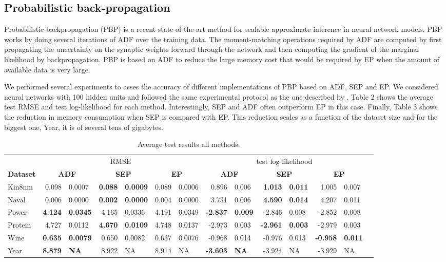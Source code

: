 \subsection{Probabilistic back-propagation}

Probabilistic-backpropagation (PBP) \cite{hernandez2015probabilistic} is a
recent state-of-the-art method for scalable approximate inference in neural
network models. PBP works by doing several iterations of ADF over the training
data.  The moment-matching operations required by ADF are computed by
first propagating the uncertainty on the synaptic weights forward through the network
and then computing the gradient of the marginal likelihood by backpropagation.
PBP is based on ADF to reduce the large memory cost that would be required by EP
when the amount of available data is very large.

We performed several experiments to asses the accuracy of different implementations of PBP
based on ADF, SEP and EP. We considered neural networks with 100 hidden units and followed the same experimental protocol 
as the one described by \cite{hernandez2015probabilistic}.
Table 2 shows the average test RMSE and test log-likelihood for each method.
Interestingly, SEP and ADF often outperform EP in this case.
Finally, Table 3 shows the reduction in memory consumption when SEP is compared with EP.
This reduction scales as a function of the dataset size and for the biggest
one, Year, it is of several tens of gigabytes.
 
\begin{table} 
\small
\centering \caption{ Average test results all methods. } \label{tab:results} \begin{tabular}{l@{\ica}r@{$\pm$}l@{\ica}r@{$\pm$}l@{\ica}r@{$\pm$}l@{\ica}r@{$\pm$}l@{\ica}r@{$\pm$}l@{\ica}r@{$\pm$}l@{\ica}r@{$\pm$}}\hline 
{} & \multicolumn{6}{c}{RMSE} & \multicolumn{6}{c}{test log-likelihood} \\
\bf{Dataset}&\multicolumn{2}{c}{\bf{ ADF }}&\multicolumn{2}{c}{\bf{ SEP }}&\multicolumn{2}{c}{\bf{ EP }} &\multicolumn{2}{c}{\bf{ ADF }}&\multicolumn{2}{c}{\bf{ SEP }}&\multicolumn{2}{c}{\bf{ EP }} \\ \hline 
%
Kin8nm&0.098&0.0007&\bf{0.088}&\bf{0.0009}&0.089&0.0006
	&0.896&0.006&\bf{1.013}&\bf{0.011}&1.005&0.007\\ 
%
Naval&0.006&0.0000&\bf{0.002}&\bf{0.0000}&0.004&0.0000
	&3.731&0.006&\bf{4.590}&\bf{0.014}&4.207&0.011\\  
%
Power&\bf{4.124}&\bf{0.0345}&4.165&0.0336&4.191&0.0349
	&\bf{-2.837}&\bf{0.009}&-2.846&0.008&-2.852&0.008\\
% 
Protein&4.727&0.0112&\bf{4.670}&\bf{0.0109}&4.748&0.0137
	&-2.973&0.003&\bf{-2.961}&\bf{0.003}&-2.979&0.003\\ 
%
Wine&\bf{0.635}&\bf{0.0079}&0.650&0.0082&0.637&0.0076
	&-0.968&0.014&-0.976&0.013&\bf{-0.958}&\bf{0.011}\\  
%
Year&\bf{8.879}&\bf{   NA}&8.922&   NA&8.914&   NA
&\bf{-3.603}&\bf{  NA}&-3.924&  NA&-3.929&  NA\\
 \hline \end{tabular} \end{table} 


